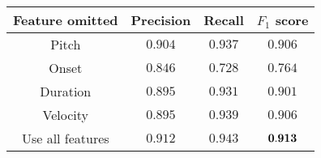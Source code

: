 \begin{tabular}{cccc}
    \textbf{Feature omitted} & Precision & Recall  & $F_1$ score   \\\hline
    Pitch                    & $0.904$   & $0.937$ & $0.906$       \\
    Onset                    & $0.846$   & $0.728$ & $0.764$       \\
    Duration                 & $0.895$   & $0.931$ & $0.901$       \\
    Velocity                 & $0.895$   & $0.939$ & $0.906$       \\
    Use all features         & $0.912$   & $0.943$ & ${\bf 0.913}$ \\
\end{tabular}

